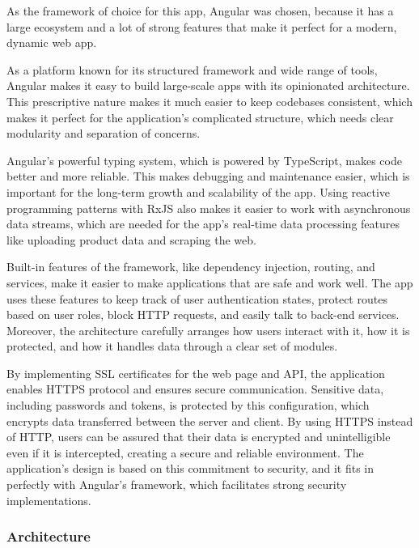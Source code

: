 As the framework of choice for this app, Angular was chosen, because it has a large ecosystem and a lot of strong features that make it perfect for a modern, dynamic web app.

As a platform known for its structured framework and wide range of tools, Angular makes it easy to build large-scale apps with its opinionated architecture. This prescriptive nature makes it much easier to keep codebases consistent, which makes it perfect for the application's complicated structure, which needs clear modularity and separation of concerns.

Angular's powerful typing system, which is powered by TypeScript, makes code better and more reliable. This makes debugging and maintenance easier, which is important for the long-term growth and scalability of the app. Using reactive programming patterns with RxJS also makes it easier to work with asynchronous data streams, which are needed for the app's real-time data processing features like uploading product data and scraping the web.

Built-in features of the framework, like dependency injection, routing, and services, make it easier to make applications that are safe and work well. The app uses these features to keep track of user authentication states, protect routes based on user roles, block HTTP requests, and easily talk to back-end services. Moreover, the architecture carefully arranges how users interact with it, how it is protected, and how it handles data through a clear set of modules.
\newline\cite{angular}

By implementing SSL certificates for the web page and API, the application enables HTTPS protocol and ensures secure communication. Sensitive data, including passwords and tokens, is protected by this configuration, which encrypts data transferred between the server and client. By using HTTPS instead of HTTP, users can be assured that their data is encrypted and unintelligible even if it is intercepted, creating a secure and reliable environment. The application's design is based on this commitment to security, and it fits in perfectly with Angular's framework, which facilitates strong security implementations.

\newpage

\subsubsection{Architecture}

